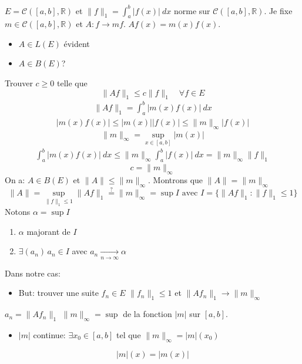 \documentclass[a4paper]{report}
\newcommand\R{\ensuremath{\mathbb{R}}}
\theoremstyle{definition}
\begin{document}
\begin{preuve}
    $E = \mathcal{C}([a, b], \R)$ et $\|f\|_1 = \int_{{a}}^{{b}} {|f(x)|} \: d{x}$ norme sur $\mathcal{C}([a, b], \R)$. Je fixe $m \in \mathcal{C}([a, b], \R)$ et $A: f \to mf$. $Af(x) = m(x)f(x)$. 
    \begin{itemize}
        \item $A \in L(E)$ évident
        \item $A \in B(E)$?
    \end{itemize}
    Trouver $c \ge 0$ telle que 
    \[
    \|Af\|_{1} \le c \|f\|_1 \quad \forall f \in E
    \] 
    \begin{align*}
        \|Af\|_1 = \int_{{a}}^{{b}} {|m(x)f(x)|} \: d{x}
    \end{align*}
    \begin{align*}
        |m(x)f(x)| \le |m(x)| |f(x)| \le \|m\|_{\infty} |f(x)|
    \end{align*}
    \[
        \|m\|_{\infty} = \sup_{x \in [a, b]}|m(x)|
    \] 
    \begin{align*}
        \int_{{a}}^{{b}} {|m(x)f(x)|} \: d{x} \le \|m\|_{\infty}\int_{{a}}^{{b}} {|f(x)|} \: d{x} = \|m\|_{\infty}\|f\|_1
    \end{align*}
    \[
    c = \|m\|_{\infty}
    \] 
    On a: $A \in B(E)$ et $\|A\| \le \|m\|_{\infty}$. Montrons que $\|A\| = \|m\|_{\infty}$
    \[
        \|A\| = \sup_{\|f\|_1 \le 1} \|Af\|_{1} \overset{?}{=} \|m\|_{\infty} = \sup I \text{ avec } I = \{ \|Af\|_{1} : \|f\|_{1} \le 1 \}
    \] 
    Notons $\alpha = \sup I$
     \begin{enumerate}
        \item $\alpha$ majorant de  $I$
        \item  $\exists (a_n) \, a_n \in I$ avec $a_n \xrightarrow[n \to \infty]{} \alpha$
    \end{enumerate}
    Dans notre cas:
    \begin{itemize}
        \item But: trouver une suite $f_n \in E$ $\|f_n\|_1 \le 1$ et $\|Af_n\|_{1} \to \|m\|_{\infty}$
    \end{itemize}
    $a_n = \|Af_n\|_{1}$ $\|m\|_{\infty} = \sup$ de la fonction $|m|$ sur  $[a, b]$.
     \begin{itemize}
         \item $|m|$ continue:  $\exists x_0 \in [a, b]$ tel que $\|m\|_{\infty} = |m|(x_0)$
    \end{itemize}
    \[
    |m|(x) = |m(x)|
    \] 
\begin{figure}[H]

\end{figure}
\end{preuve}
\end{document}
